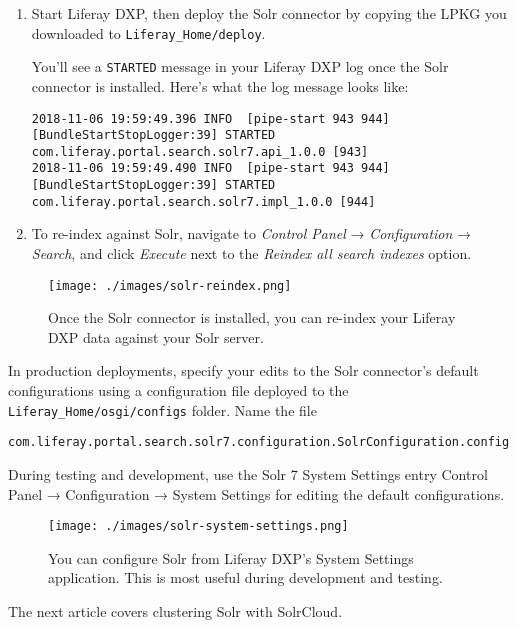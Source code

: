 \begin{enumerate}
\def\labelenumi{\arabic{enumi}.}
\item
  Start Liferay DXP, then deploy the Solr connector by copying the LPKG
  you downloaded to \texttt{Liferay\_Home/deploy}.

  You'll see a \texttt{STARTED} message in your Liferay DXP log once the
  Solr connector is installed. Here's what the log message looks like:

\begin{verbatim}
2018-11-06 19:59:49.396 INFO  [pipe-start 943 944][BundleStartStopLogger:39] STARTED com.liferay.portal.search.solr7.api_1.0.0 [943]
2018-11-06 19:59:49.490 INFO  [pipe-start 943 944][BundleStartStopLogger:39] STARTED com.liferay.portal.search.solr7.impl_1.0.0 [944]
\end{verbatim}
\item
  To re-index against Solr, navigate to \emph{Control Panel} →
  \emph{Configuration} → \emph{Search}, and click \emph{Execute} next to
  the \emph{Reindex all search indexes} option.
\end{enumerate}

\begin{figure}
\centering
\texttt{[image: ./images/solr-reindex.png]}
\caption{Once the Solr connector is installed, you can re-index your
Liferay DXP data against your Solr server.}
\end{figure}

In production deployments, specify your edits to the Solr connector's
default configurations using a configuration file deployed to the
\texttt{Liferay\_Home/osgi/configs} folder. Name the file

\begin{verbatim}
com.liferay.portal.search.solr7.configuration.SolrConfiguration.config
\end{verbatim}

During testing and development, use the Solr 7 System Settings entry
Control Panel → Configuration → System Settings for editing the default
configurations.

\begin{figure}
\centering
\texttt{[image: ./images/solr-system-settings.png]}
\caption{You can configure Solr from Liferay DXP's System Settings
application. This is most useful during development and testing.}
\end{figure}

The next article covers clustering Solr with SolrCloud.

